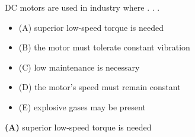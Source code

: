 

DC motors are used in industry where . . .

\begin{itemize}
\item{(A)} superior low-speed torque is needed
\vskip 5pt 
\item{(B)} the motor must tolerate constant vibration
\vskip 5pt 
\item{(C)} low maintenance is necessary
\vskip 5pt 
\item{(D)} the motor's speed must remain constant
\vskip 5pt 
\item{(E)} explosive gases may be present
\end{itemize}







{\bf (A)} superior low-speed torque is needed











